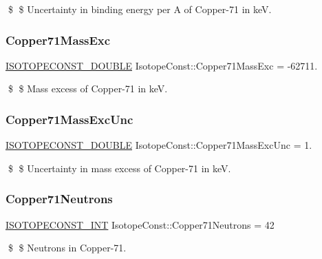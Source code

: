 \$ \$ Uncertainty in binding energy per A of Copper-\/71 in keV. \mbox{\label{group___isotope_const-_copper-_cu71_gabdb11ad7dea351bd7f991d07b60eb995}} 
\subsubsection{\texorpdfstring{Copper71\+Mass\+Exc}{Copper71MassExc}}
{\footnotesize\ttfamily \mbox{\hyperlink{group___isotope_const-_macros_ga8f45a7272ce02c0b4c65c44636ed719a}{I\+S\+O\+T\+O\+P\+E\+C\+O\+N\+S\+T\+\_\+\+D\+O\+U\+B\+LE}} Isotope\+Const\+::\+Copper71\+Mass\+Exc = -\/62711.}

\$ \$ Mass excess of Copper-\/71 in keV. \mbox{\label{group___isotope_const-_copper-_cu71_ga49c549beb074a851ddfd5fb3cf0ae999}} 
\subsubsection{\texorpdfstring{Copper71\+Mass\+Exc\+Unc}{Copper71MassExcUnc}}
{\footnotesize\ttfamily \mbox{\hyperlink{group___isotope_const-_macros_ga8f45a7272ce02c0b4c65c44636ed719a}{I\+S\+O\+T\+O\+P\+E\+C\+O\+N\+S\+T\+\_\+\+D\+O\+U\+B\+LE}} Isotope\+Const\+::\+Copper71\+Mass\+Exc\+Unc = 1.}

\$ \$ Uncertainty in mass excess of Copper-\/71 in keV. \mbox{\label{group___isotope_const-_copper-_cu71_ga2a682fb0eb1c8ec001add17c2a6227d7}} 
\subsubsection{\texorpdfstring{Copper71\+Neutrons}{Copper71Neutrons}}
{\footnotesize\ttfamily \mbox{\hyperlink{group___isotope_const-_macros_ga5f18360b3e99483a35c32d789e62621c}{I\+S\+O\+T\+O\+P\+E\+C\+O\+N\+S\+T\+\_\+\+I\+NT}} Isotope\+Const\+::\+Copper71\+Neutrons = 42}

\$ \$ Neutrons in Copper-\/71. \mbox{\label{group___isotope_const-_copper-_cu71_ga195eb9b17acce0d9fe407e85a868d096}} 
